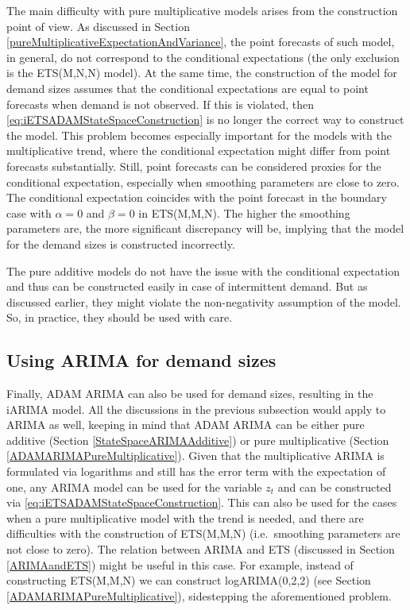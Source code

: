 \documentclass[]{book}
\theoremstyle{definition}
\theoremstyle{definition}
\theoremstyle{definition}
\theoremstyle{definition}
\theoremstyle{remark}
\begin{document}
The main difficulty with pure multiplicative models arises from the construction point of view. As discussed in Section \ref{pureMultiplicativeExpectationAndVariance}, the point forecasts of such model, in general, do not correspond to the conditional expectations (the only exclusion is the ETS(M,N,N) model). At the same time, the construction of the model for demand sizes assumes that the conditional expectations are equal to point forecasts when demand is not observed. If this is violated, then \eqref{eq:iETSADAMStateSpaceConstruction} is no longer the correct way to construct the model. This problem becomes especially important for the models with the multiplicative trend, where the conditional expectation might differ from point forecasts substantially. Still, point forecasts can be considered proxies for the conditional expectation, especially when smoothing parameters are close to zero. The conditional expectation coincides with the point forecast in the boundary case with \(\alpha=0\) and \(\beta=0\) in ETS(M,M,N). The higher the smoothing parameters are, the more significant discrepancy will be, implying that the model for the demand sizes is constructed incorrectly.

The pure additive models do not have the issue with the conditional expectation and thus can be constructed easily in case of intermittent demand. But as discussed earlier, they might violate the non-negativity assumption of the model. So, in practice, they should be used with care.

\hypertarget{using-arima-for-demand-sizes}{%
\subsection{Using ARIMA for demand sizes}\label{using-arima-for-demand-sizes}}

Finally, ADAM ARIMA can also be used for demand sizes, resulting in the iARIMA model. All the discussions in the previous subsection would apply to ARIMA as well, keeping in mind that ADAM ARIMA can be either pure additive (Section \ref{StateSpaceARIMAAdditive}) or pure multiplicative (Section \ref{ADAMARIMAPureMultiplicative}). Given that the multiplicative ARIMA is formulated via logarithms and still has the error term with the expectation of one, any ARIMA model can be used for the variable \(z_t\) and can be constructed via \eqref{eq:iETSADAMStateSpaceConstruction}. This can also be used for the cases when a pure multiplicative model with the trend is needed, and there are difficulties with the construction of ETS(M,M,N) (i.e.~smoothing parameters are not close to zero). The relation between ARIMA and ETS (discussed in Section \ref{ARIMAandETS}) might be useful in this case. For example, instead of constructing ETS(M,M,N) we can construct logARIMA(0,2,2) (see Section \ref{ADAMARIMAPureMultiplicative}), sidestepping the aforementioned problem.
\end{document}
